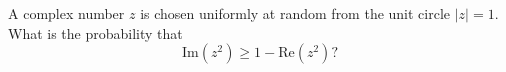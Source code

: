 A complex number $z$ is chosen uniformly at random from the unit circle $|z|=1$. What is the probability that
\[\mathrm{Im}\left(z^2\right)\ge1-\mathrm{Re}\left(z^2\right)?\]
